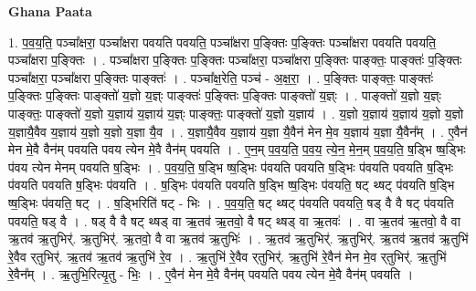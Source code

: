 \documentclass[17pt]{extarticle}
\begin{document}
\textbf{Ghana Paata } \newline

1. प॒व॒य॒ति॒ पञ्चा᳚क्षरा॒ पञ्चा᳚क्षरा पवयति पवयति॒ पञ्चा᳚क्षरा प॒ङ्क्तिः प॒ङ्क्तिः पञ्चा᳚क्षरा पवयति पवयति॒ पञ्चा᳚क्षरा प॒ङ्क्तिः । . पञ्चा᳚क्षरा प॒ङ्क्तिः प॒ङ्क्तिः पञ्चा᳚क्षरा॒ पञ्चा᳚क्षरा प॒ङ्क्तिः पाङ्क्तः॒ पाङ्क्तः॑ प॒ङ्क्तिः पञ्चा᳚क्षरा॒ पञ्चा᳚क्षरा प॒ङ्क्तिः पाङ्क्तः॑ । . पञ्चा᳚क्ष॒रेति॒ पञ्च॑ - अ॒क्ष॒रा॒ । . प॒ङ्क्तिः पाङ्क्तः॒ पाङ्क्तः॑ प॒ङ्क्तिः प॒ङ्क्तिः पाङ्क्तो॑ य॒ज्ञो य॒ज्ञ्ः पाङ्क्तः॑ प॒ङ्क्तिः प॒ङ्क्तिः पाङ्क्तो॑ य॒ज्ञ्ः । . पाङ्क्तो॑ य॒ज्ञो य॒ज्ञ्ः पाङ्क्तः॒ पाङ्क्तो॑ य॒ज्ञो य॒ज्ञाय॑ य॒ज्ञाय॑ य॒ज्ञ्ः पाङ्क्तः॒ पाङ्क्तो॑ य॒ज्ञो य॒ज्ञाय॑ । . य॒ज्ञो य॒ज्ञाय॑ य॒ज्ञाय॑ य॒ज्ञो य॒ज्ञो य॒ज्ञायै॒वैव य॒ज्ञाय॑ य॒ज्ञो य॒ज्ञो य॒ज्ञा यै॒व । . य॒ज्ञायै॒वैव य॒ज्ञाय॑ य॒ज्ञा यै॒वैन॑ मेन मे॒व य॒ज्ञाय॑ य॒ज्ञा यै॒वैन᳚म् । . ए॒वैन॑ मेन मे॒वै वैन॑म् पवयति पवय त्येन मे॒वै वैन॑म् पवयति । . ए॒न॒म् प॒व॒य॒ति॒ प॒व॒य॒ त्ये॒न॒ मे॒न॒म् प॒व॒य॒ति॒ ष॒ड्भि ष्ष॒ड्भिः प॑वय त्येन मेनम् पवयति ष॒ड्भिः । . प॒व॒य॒ति॒ ष॒ड्भि ष्ष॒ड्भिः प॑वयति पवयति ष॒ड्भिः प॑वयति पवयति ष॒ड्भिः प॑वयति पवयति ष॒ड्भिः प॑वयति । . ष॒ड्भिः प॑वयति पवयति ष॒ड्भि ष्ष॒ड्भिः प॑वयति॒ षट् थ्षट् प॑वयति ष॒ड्भि ष्ष॒ड्भिः प॑वयति॒ षट् । . ष॒ड्भिरिति॑ षट् - भिः । . प॒व॒य॒ति॒ षट् थ्षट् प॑वयति पवयति॒ षड् वै वै षट् प॑वयति पवयति॒ षड् वै । . षड् वै वै षट् थ्षड् वा ऋ॒तव॑ ऋ॒तवो॒ वै षट् थ्षड् वा ऋ॒तवः॑ । . वा ऋ॒तव॑ ऋ॒तवो॒ वै वा ऋ॒तव॑ ऋ॒तुभिर्॑. ऋ॒तुभिर्॑. ऋ॒तवो॒ वै वा ऋ॒तव॑ ऋ॒तुभिः॑ । . ऋ॒तव॑ ऋ॒तुभिर्॑. ऋ॒तुभिर्॑. ऋ॒तव॑ ऋ॒तव॑ ऋ॒तुभि॑ रे॒वैव र्‌तुभिर्॑. ऋ॒तव॑ ऋ॒तव॑ ऋ॒तुभि॑ रे॒व । . ऋ॒तुभि॑ रे॒वैव र्‌तुभिर्॑. ऋ॒तुभि॑ रे॒वैन॑ मेन मे॒व र्‌तुभिर्॑. ऋ॒तुभि॑ रे॒वैन᳚म् । . ऋ॒तुभि॒रित्यृ॒तु - भिः॒ । . ए॒वैन॑ मेन मे॒वै वैन॑म् पवयति पवय त्येन मे॒वै वैन॑म् पवयति । \newline
\end{document}
